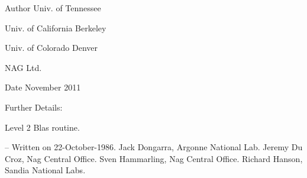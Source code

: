 \begin{DoxyAuthor}{Author}
Univ. of Tennessee 

Univ. of California Berkeley 

Univ. of Colorado Denver 

N\+A\+G Ltd. 
\end{DoxyAuthor}
\begin{DoxyDate}{Date}
November 2011 
\end{DoxyDate}
\begin{DoxyParagraph}{Further Details\+: }
\begin{DoxyVerb}  Level 2 Blas routine.

  -- Written on 22-October-1986.
     Jack Dongarra, Argonne National Lab.
     Jeremy Du Croz, Nag Central Office.
     Sven Hammarling, Nag Central Office.
     Richard Hanson, Sandia National Labs.\end{DoxyVerb}
 
\end{DoxyParagraph}
